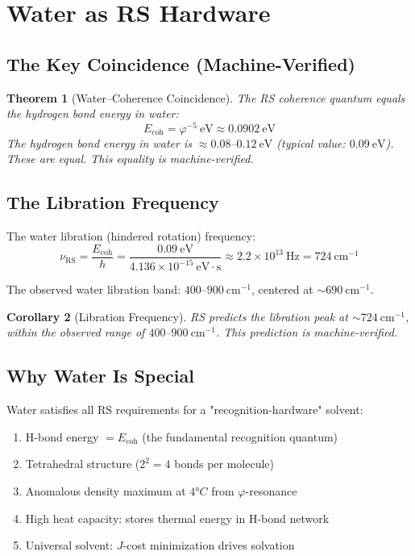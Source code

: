 \documentclass[12pt,a4paper]{article}
\newtheorem{theorem}{Theorem}[section]
\newtheorem{corollary}[theorem]{Corollary}
\theoremstyle{definition}
\theoremstyle{remark}
\begin{document}
\section{Water as RS Hardware}

\subsection{The Key Coincidence (Machine-Verified)}

\begin{theorem}[Water--Coherence Coincidence]
The RS coherence quantum equals the hydrogen bond energy in water:
\begin{equation}
E_\mathrm{coh} = \varphi^{-5}~\mathrm{eV} \approx 0.0902~\mathrm{eV}
\end{equation}
The hydrogen bond energy in water is $\approx 0.08$--$0.12~\mathrm{eV}$ (typical value: $0.09~\mathrm{eV}$).
These are equal. This equality is machine-verified.
\end{theorem}

\subsection{The Libration Frequency}

The water libration (hindered rotation) frequency:
\begin{equation}
\nu_\mathrm{RS} = \frac{E_\mathrm{coh}}{h} = \frac{0.09~\mathrm{eV}}{4.136 \times 10^{-15}~\mathrm{eV\cdot s}} 
\approx 2.2 \times 10^{13}~\mathrm{Hz} = 724~\mathrm{cm}^{-1}
\end{equation}

The observed water libration band: $400$–$900~\mathrm{cm}^{-1}$, centered at $\sim 690~\mathrm{cm}^{-1}$.

\begin{corollary}[Libration Frequency]
RS predicts the libration peak at $\sim 724~\mathrm{cm}^{-1}$, within the observed range of $400$--$900~\mathrm{cm}^{-1}$.
This prediction is machine-verified.
\end{corollary}

\subsection{Why Water Is Special}

Water satisfies all RS requirements for a "recognition-hardware" solvent:
\begin{enumerate}
\item H-bond energy $= E_\mathrm{coh}$ (the fundamental recognition quantum)
\item Tetrahedral structure ($2^2 = 4$ bonds per molecule)
\item Anomalous density maximum at $4°C$ from $\varphi$-resonance
\item High heat capacity: stores thermal energy in H-bond network
\item Universal solvent: $J$-cost minimization drives solvation
\end{enumerate}
\end{document}

